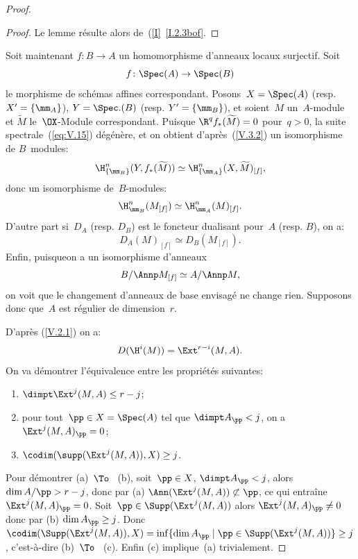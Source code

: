 \begin{proof}
\begin{proof}
Le lemme r\'esulte alors de~(\ref{I}~\ref{I.2.3bof}.
\end{proof}

Soit maintenant $f\colon B\to A$ un homomorphisme d'anneaux locaux surjectif. Soit
$$f\colon\Spec(A)\to\Spec(B)$$
le morphisme de sch\'emas affines correspondant. Posons~$X=\Spec(A)$ (resp.\ $X^{\prime}=\{\mm_{A}\}$), $Y=\Spec.(B)$ (resp. $Y^{\prime}=\{\mm_{B}\}$), et soient~$M$ un~$A$-module et $\widetilde{M}$ le~$\OX$-Module correspondant. Puisque $\R^{q}f_{\ast}(\widetilde{M})=0$ pour~$q>0$, la suite spectrale~(\ref{eq:V.15}) d\'eg\'en\`ere, et on obtient d'apr\`es~(\ref{V.3.2}) un isomorphisme de $B$~modules:
\begin{equation} \label{eq:V.18} \H_{\{\mm_{B}\} }^{n}(Y, f_{\ast}(\widetilde{M}))\simeq\H_{\{\mm_{A}\} }^{n}(X, \widetilde{M})_{[f]},
\end{equation}
donc un isomorphisme de~$B$-modules:
\begin{equation} \label{eq:V.19} \H_{\mm_{B}}^{n}(M_{[f]})\simeq\H_{\mm_{A}}^{n}(M)_{[f]}.
\end{equation}
D'autre part si~$D_{A}$ (resp. $D_{B}$) est le foncteur dualisant pour~$A$ (resp. $B$), on a:
\begin{equation} \label{eq:V.20} D_{A}(M)_{[f]}\simeq D_{B}(M_{[f]}).
\end{equation}
Enfin, puisqueon a un isomorphisme d'anneaux
\begin{equation} \label{eq:V.21} B/\Annp M_{[f]}\simeq A/\Annp M,
\end{equation}
on voit que le changement d'anneaux de base envisag\'e ne change rien. Supposons donc que~$A$ est r\'egulier de dimension~$r$.

D'apr\`es (\ref{V.2.1}) on a:
\begin{equation} \label{eq:V.22}
D(\H^{i}(M))=\Ext^{r-i}(M, A).
\end{equation}
On va d\'emontrer l'\'equivalence entre les propri\'et\'es suivantes:
\begin{enumerate}
\item[(a)] $\dimpt \Ext^{j}(M, A)\leq r-j$;
\item[(b)] pour tout~$\pp\in X=\Spec(A)$ tel que $\dimpt A_{\pp}<j$, on a~$\Ext^{j}(M, A)_{\pp}=0$;
\item[(c)] $\codim(\supp(\Ext^{j}(M, A)), X)\geq j$.
\end{enumerate}

Pour d\'emontrer (a)~$\To$~ (b), soit~$\pp\in X$, $\dimpt A_\pp<j$, alors $\dim A/\pp>r-j$, donc par (a) $\Ann(\Ext^{j}(M, A))\not\subset\pp$, ce qui entra\^ine $\Ext^{j}(M, A)_{\pp}=0$. Soit~$\pp\in\Supp(\Ext^{j}(M, A))$ alors $\Ext^{j}(M, A)_{\pp}\neq 0$ donc par (b) $\dim A_\pp\geq j$. Donc $\codim(\Supp(\Ext^{j}(M, A)), X)=\inf\{ \dim A_\pp\mid \pp\in\Supp(\Ext^{j}(M, A))\} \geq j$, c'est-\`a-dire (b)~$\To$~ (c). Enfin (c) implique~(a) trivialement.


\end{proof}
